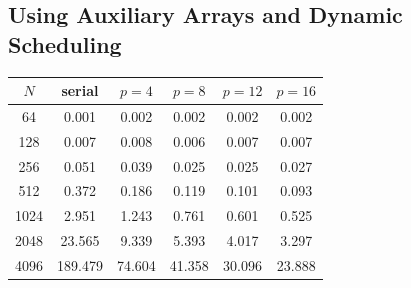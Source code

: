 \documentclass{article}
\begin{document}
\subsection*{Using Auxiliary Arrays and Dynamic Scheduling}
\begin{table}[!h]
\centering
\begin{tabular}{|c|c|c|c|c|c|} \hline
$N$ & serial & $p=4$ & $p=8$ & $p=12$ & $p=16$\\ \hline
64   & 0.001 & 0.002 & 0.002 & 0.002 &  0.002 \\
128  & 0.007 & 0.008 & 0.006 & 0.007 &  0.007 \\
256  & 0.051 & 0.039 & 0.025 & 0.025 &  0.027 \\ 
512  & 0.372 & 0.186 & 0.119 & 0.101 &  0.093 \\
1024 & 2.951 & 1.243 & 0.761 & 0.601 &  0.525 \\
2048 & 23.565 & 9.339 & 5.393 & 4.017 & 3.297 \\
4096 & 189.479 & 74.604 & 41.358 & 30.096 & 23.888 \\ \hline
\end{tabular}
\end{table}
\end{document}
